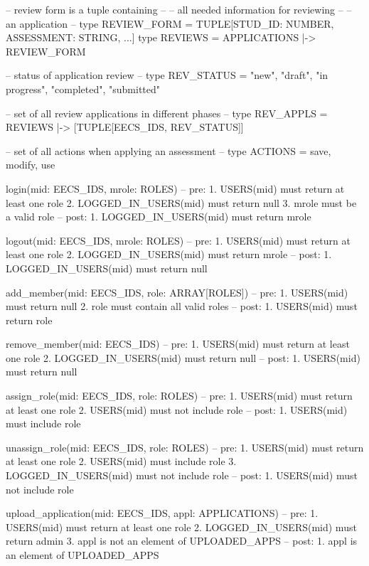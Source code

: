 \documentclass[fontsize=12pt,paper=letter,twoside]{scrartcl}
\begin{document}
\newpage
\begin{code}
-- review form is a tuple containing --
-- all needed information for reviewing --
-- an application --
type REVIEW_FORM = TUPLE[STUD_ID: NUMBER, ASSESSMENT: STRING, ...]
type REVIEWS = APPLICATIONS |-> REVIEW_FORM

-- status of application review --
type REV_STATUS = {"new", "draft", "in progress", "completed", 
"submitted"}

-- set of all review applications in different phases --
type REV_APPLS = REVIEWS |-> [TUPLE[EECS_IDS, REV_STATUS]]

-- set of all actions when applying an assessment --
type ACTIONS = {save, modify, use}

login(mid: EECS_IDS, mrole: ROLES)
	-- pre: 
		1. USERS(mid) must return at least one role
		2. LOGGED_IN_USERS(mid) must return null
		3. mrole must be a valid role
	-- post:
		1. LOGGED_IN_USERS(mid) must return mrole

logout(mid: EECS_IDS, mrole: ROLES)
	-- pre: 
		1. USERS(mid) must return at least one role
		2. LOGGED_IN_USERS(mid) must return mrole
	-- post:
		1. LOGGED_IN_USERS(mid) must return null
\end{code}

\newpage
\begin{code}
add_member(mid: EECS_IDS, role: ARRAY[ROLES])
	-- pre: 
		1. USERS(mid) must return null
		2. role must contain all valid roles
	-- post:
		1. USERS(mid) must return role

remove_member(mid: EECS_IDS)
	-- pre: 
		1. USERS(mid) must return at least one role
		2. LOGGED_IN_USERS(mid) must return null
	-- post:
		1. USERS(mid) must return null

assign_role(mid: EECS_IDS, role: ROLES)
	-- pre: 
		1. USERS(mid) must return at least one role
		2. USERS(mid) must not include role
	-- post:
		1. USERS(mid) must include role

unassign_role(mid: EECS_IDS, role: ROLES)
	-- pre: 
		1. USERS(mid) must return at least one role
		2. USERS(mid) must include role
		3. LOGGED_IN_USERS(mid) must not include role
	-- post:
		1. USERS(mid) must not include role
		
upload_application(mid: EECS_IDS, appl: APPLICATIONS)
	-- pre: 
		1. USERS(mid) must return at least one role
		2. LOGGED_IN_USERS(mid) must return admin
		3. appl is not an element of UPLOADED_APPS
	-- post:
		1. appl is an element of UPLOADED_APPS
\end{code}
\end{document}
